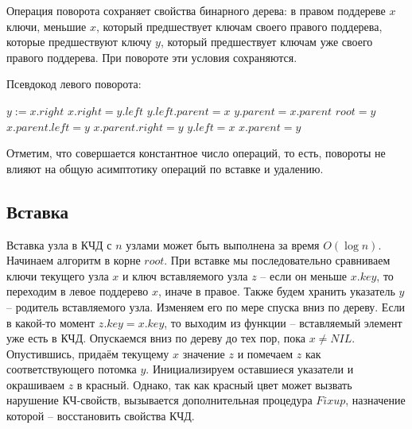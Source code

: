 \documentclass[a4paper,12pt]{article}
\begin{document}
Операция поворота сохраняет свойства бинарного дерева: в правом поддереве $x$ ключи, меньшие $x$, который предшествует ключам своего правого поддерева, которые предшествуют ключу $y$, который предшествует ключам уже своего правого поддерева. При повороте эти условия сохраняются. 

Псевдокод левого поворота:

\begin{algorithm}
  	\caption{($Tree,\ x$)}
	\begin{algorithmic}
	    \State $y := x.right$
	    \State $x.right = y.left$ 
	    \State 
	        \State $y.left.parent = x$
	   \EndIf
	   \State $y.parent = x.parent$
	        \State $root = y$
	        \State $x.parent.left = y$
	   \Else
	        \State $x.parent.right = y$
	   \EndIf
	   \State $y.left = x$
	   \State $x.parent = y$
	\end{algorithmic}
\end{algorithm}

Отметим, что совершается константное число операций, то есть, повороты не влияют на общую асимптотику операций по вставке и удалению.

\subsection{Вставка}

Вставка узла в КЧД с $n$ узлами может быть выполнена за время $O(\log n)$. Начинаем алгоритм в корне $root$. При вставке мы последовательно сравниваем ключи текущего узла $x$ и ключ вставляемого узла $z$ -- если он меньше $x.key$, то переходим в левое поддерево $x$, иначе в правое. Также будем хранить указатель $y$ -- родитель вставляемого узла. Изменяем его по мере спуска вниз по дереву. Если в какой-то момент $z.key = x.key$, то выходим из функции -- вставляемый элемент уже есть в КЧД. Опускаемся вниз по дереву до тех пор, пока $x\neq NIL$. Опустившись, придаём текущему $x$ значение $z$ и помечаем $z$ как соответствующего потомка $y$. Инициализируем оставшиеся указатели и окрашиваем $z$ в красный. Однако, так как красный цвет может вызвать нарушение КЧ-свойств, вызывается дополнительная процедура $Fixup$, назначение которой -- восстановить свойства КЧД.
\end{document}
